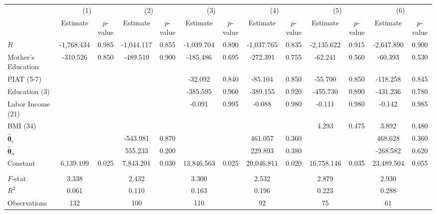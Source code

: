 \begin{tabular}{lcccccccccccc} \toprule
 & \multicolumn{2}{c}{(1)}  &  \multicolumn{2}{c}{(2)}  &  \multicolumn{2}{c}{(3)}  &  \multicolumn{2}{c}{(4)}  & \multicolumn{2}{c}{(5)} & \multicolumn{2}{c}{(6)} \\  
 & Estimate & $p$-value & Estimate & $p$-value & Estimate & $p$-value & Estimate & $p$-value & Estimate & $p$-value & Estimate & $p$-value \\ \midrule
$R$ & -1,768.434 &     0.985 & -1,044.117 &     0.855 & -1,039.704 &     0.890 & -1,037.765 &     0.835 & -2,135.622 &     0.915 & -2,647.890 &     0.900 \\  
Mother's Education &  -310.526 &     0.850 &  -489.510 &     0.900 &  -185.486 &     0.695 &  -272.391 &     0.755 &   -62.241 &     0.560 &   -60.393 &     0.530 \\  
PIAT (5-7) &         &         &         &         &   -32.092 &     0.840 &   -85.104 &     0.850 &   -55.700 &     0.850 &  -118.258 &     0.845 \\  
Education (3) &         &         &         &         &  -385.595 &     0.960 &  -389.155 &     0.920 &  -455.730 &     0.890 &  -431.236 &     0.780 \\  
Labor Income (21) &         &         &         &         &    -0.091 &     0.995 &    -0.088 &     0.980 &    -0.111 &     0.980 &    -0.142 &     0.985 \\  
BMI (34) &         &         &         &         &         &         &         &         &     4.293 &     0.475 &     3.892 &     0.480 \\  
$\hat{\bm{\theta}}_c$ &         &         &  -543.981 &     0.870 &         &         &   461.057 &     0.360 &         &         &   468.628 &     0.360 \\  
$\hat{\bm{\theta}}_n$ &         &         &   555.233 &     0.200 &         &         &   229.893 &     0.380 &         &         &  -268.582 &     0.620 \\  
Constant &  6,139.199 &     0.025 &  7,843.201 &     0.030 & 13,846.563 &     0.025 & 20,046.811 &     0.020 & 16,758.146 &     0.035 & 23,489.504 &     0.055 \\ \\ \midrule   
$F$-stat &     3.338 &     &     2.432 &      &     3.300 &     &     2.532 &      &     2.879 &    &     2.930 &     \\  
$R^2$ &     0.061 &      &     0.110 &      &     0.163 &      &     0.196 &      &     0.223 &      &     0.288 &      \\  
Observations &   132 &      &   100 &     &   110 &     &    92 &      &    75 &   &    61 &      \\  
\bottomrule \end{tabular}
